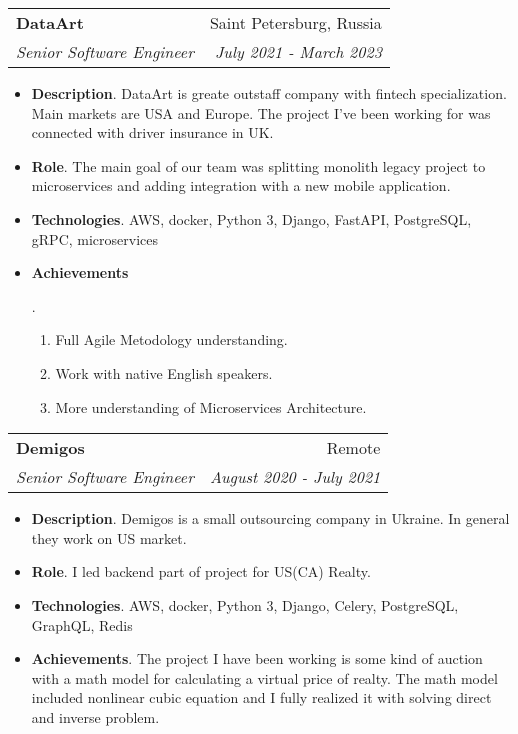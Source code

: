 \documentclass[letterpaper,11pt]{article}
\makeatletter
\newcommand{\resumeItem}[2]{
  \item\small{
    \textbf{#1}{. #2 \vspace{-2pt}}
  }
}
\newcommand{\resumeSubheading}[4]{
  \vspace{-1pt}\item
    \begin{tabular*}{0.97\textwidth}{l@{\extracolsep{\fill}}r}
      \textbf{#1} & #2 \\
      \textit{\small#3} & \textit{\small #4} \\
    \end{tabular*}\vspace{-5pt}
}
\newcommand{\resumeItemListStart}{\begin{itemize}}
\newcommand{\resumeItemListEnd}{\end{itemize}\vspace{-5pt}}
\makeatother
\begin{document}
    \resumeSubheading
      {DataArt}{Saint Petersburg, Russia}
      {Senior Software Engineer}{July 2021 - March 2023}
      \resumeItemListStart
        \resumeItem{Description}
	  {DataArt is greate outstaff company with fintech specialization. Main markets are USA and Europe. The project I've been working for was connected with driver insurance in UK.}
	\resumeItem{Role}
	  {The main goal of our team was splitting monolith legacy project to microservices and adding integration with a new mobile application.}
	\resumeItem{Technologies}
	  {AWS, docker, Python 3, Django, FastAPI, PostgreSQL, gRPC, microservices}
	\resumeItem{Achievements}
          {
            \begin{enumerate}
              \item Full Agile Metodology understanding.
	      \item Work with native English speakers.
	      \item More understanding of Microservices Architecture.
            \end{enumerate}
          }
      \resumeItemListEnd

    \resumeSubheading
      {Demigos}{Remote}
      {Senior Software Engineer}{August 2020 - July 2021}
      \resumeItemListStart
        \resumeItem{Description}
	  {Demigos is a small outsourcing company in Ukraine. In general they work on US market.}
	\resumeItem{Role}
	  {I led backend part of project for US(CA) Realty.}
	\resumeItem{Technologies}
	  {AWS, docker, Python 3, Django, Celery, PostgreSQL, GraphQL, Redis}
	\resumeItem{Achievements}
	{The project I have been working is some kind of auction with a math model for calculating a virtual price of realty. The math model included nonlinear cubic equation and I fully realized it with solving direct and inverse problem.}
      \resumeItemListEnd
\end{document}
